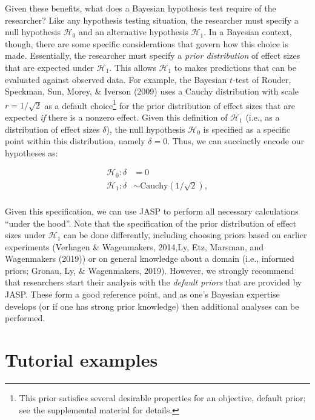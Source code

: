 \documentclass[english,,doc,floatsintext]{apa6}
\begin{document}
Given these benefits, what does a Bayesian hypothesis test require of the researcher? Like any hypothesis testing situation, the researcher must specify a null hypothesis \(\mathcal{H}_0\) and an alternative hypothesis \(\mathcal{H}_1\). In a Bayesian context, though, there are some specific considerations that govern how this choice is made. Essentially, the researcher must specify a \emph{prior distribution} of effect sizes that are expected under \(\mathcal{H}_1\). This allows \(\mathcal{H}_1\) to makes predictions that can be evaluated against observed data. For example, the Bayesian \(t\)-test of Rouder, Speckman, Sun, Morey, \& Iverson (2009) uses a Cauchy distribution with scale \(r=1/\sqrt{2}\) as a default choice\footnote{This prior satisfies several desirable properties for an objective, default prior; see the supplemental material for details.} for the prior distribution of effect sizes that are expected \emph{if} there is a nonzero effect. Given this definition of \(\mathcal{H}_1\) (i.e., as a distribution of effect sizes \(\delta\)), the null hypothesis \(\mathcal{H}_0\) is specified as a specific point within this distribution, namely \(\delta=0\). Thus, we can succinctly encode our hypotheses as:

\begin{align*}
\mathcal{H}_0: \delta &=0\\
\mathcal{H}_1: \delta &\sim \text{Cauchy}(1/\sqrt{2}),\\
\end{align*}

Given this specification, we can use JASP to perform all necessary calculations \enquote{under the hood}. Note that the specification of the prior distribution of effect sizes under \(\mathcal{H}_1\) can be done differently, including choosing priors based on earlier experiments (Verhagen \& Wagenmakers, 2014,Ly, Etz, Marsman, and Wagenmakers (2019)) or on general knowledge about a domain (i.e., informed priors; Gronau, Ly, \& Wagenmakers, 2019). However, we strongly recommend that researchers start their analysis with the \emph{default priors} that are provided by JASP. These form a good reference point, and as one's Bayesian expertise develops (or if one has strong prior knowledge) then additional analyses can be performed.

\hypertarget{tutorial-examples}{%
\section{Tutorial examples}\label{tutorial-examples}}
\end{document}
